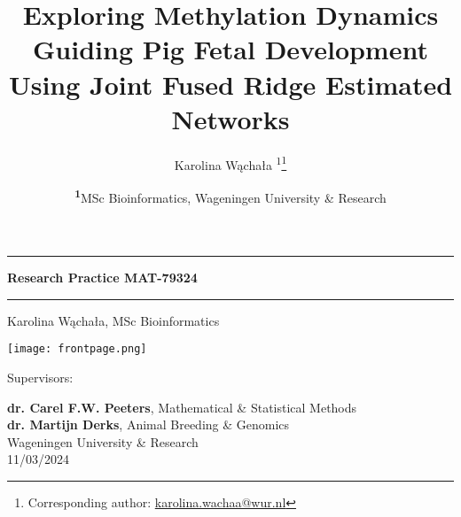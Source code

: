 \documentclass[
	a4paper, %
	10pt, %
	unnumberedsections, %
	twoside, %
]{LTJournalArticle}
\title{\normalsize Exploring Methylation Dynamics Guiding Pig Fetal Development \\ Using Joint Fused Ridge Estimated Networks} %
\author{\small%
	Karolina Wąchała \textsuperscript{1}\thanks{Corresponding author: \href{mailto:karolina.wachaa@wur.nl}{karolina.wachaa@wur.nl}}
}
\date{\footnotesize\textsuperscript{\textbf{1}}MSc Bioinformatics, Wageningen University \& Research}
\begin{document}
\begin{titlepage}
    \centering
    \vspace*{1cm}
    \hrule %
    \vspace{0.2cm}
    {\color{MidnightBlue}\Huge\bfseries Research Practice MAT-79324\par} %
    \vspace{0.5cm}
    \hrule %
    \vspace{0.5cm}
    {\Large Karolina Wąchała, MSc Bioinformatics\par}
    \vfill
    \texttt{[image: frontpage.png]} %
    \vfill
    {\large Supervisors: \par} %
    \vspace{0.5cm} %
    \textbf{dr. Carel F.W. Peeters}, Mathematical \& Statistical Methods \\
    \textbf{dr. Martijn Derks}, Animal Breeding \& Genomics \\
    \vspace{0.5cm}
    {\large Wageningen University \& Research}\\
	\vspace{0.2cm}
	{\large 11/03/2024}
\end{titlepage}
\end{document}
